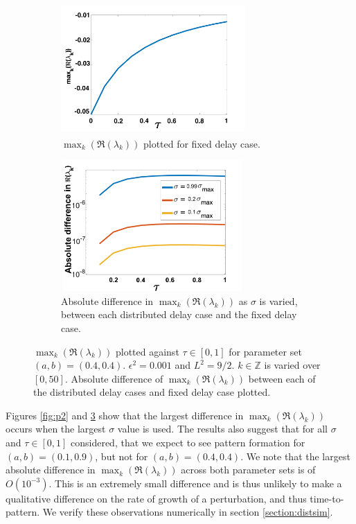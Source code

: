 \begin{figure}[H]
    \centering
    \begin{subfigure}[t]{0.45\textwidth}
        \centering
        \includegraphics[width=7cm,height=5cm]{p3fixed.png}
        \caption{$\max_k(\Re(\lambda_k))$ plotted for fixed delay case.}
        \label{}
    \end{subfigure}
    \hfill
    \begin{subfigure}[t]{0.45\textwidth}
        \centering
        \includegraphics[width=7cm,height=5cm]{dispdiff2.png}
        \caption{Absolute difference in $\max_k(\Re(\lambda_k))$ as $\sigma$ is varied, between each distributed delay case and the fixed delay case.}
        \label{}
    \end{subfigure}
    \caption{$\max_k(\Re(\lambda_k))$ plotted against $\tau\in[0,1]$ for parameter set $(a,b)=(0.4,0.4)$. $\epsilon^2=0.001$ and $L^2=9/2$. $k\in\mathbb{Z}$ is varied over $[0,50]$. Absolute difference of $\max_k(\Re(\lambda_k))$ between each of the distributed delay cases and fixed delay case plotted.}
    \label{fig:p3}
\end{figure}

Figures \ref{fig:p2} and \ref{fig:p3} show that the largest difference in $\max_k(\Re(\lambda_k))$ occurs when the largest $\sigma$ value is used. The results also suggest that for all $\sigma$ and $\tau\in[0,1]$ considered, that we expect to see pattern formation for $(a,b)=(0.1,0.9)$, but not for $(a,b)=(0.4,0.4)$. We note that the largest absolute difference in $\max_k(\Re(\lambda_k))$ across both parameter sets is of $O(10^{-3})$. This is an extremely small difference and is thus unlikely to make a qualitative difference on the rate of growth of a perturbation, and thus time-to-pattern. We verify these observations numerically in section \ref{section:distsim}.

